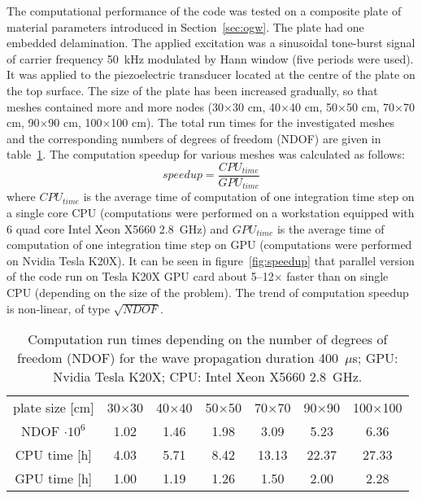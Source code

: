 \documentclass[12pt]{iopart}
\begin{document}
The computational performance of the code was tested on a composite plate of material parameters introduced in Section~\ref{sec:ogw}. The plate had one embedded delamination. The applied excitation was a sinusoidal tone-burst signal of carrier frequency 50~kHz modulated by Hann window (five periods were used). It was applied to the piezoelectric transducer located at the centre of the plate on the top surface. The size of the plate has been increased gradually, so that meshes contained more and more nodes (30\(\times\)30 cm, 40\(\times\)40 cm, 50\(\times\)50 cm, 70\(\times\)70 cm, 90\(\times\)90 cm, 100\(\times\)100 cm). The total run times for the investigated meshes and the corresponding numbers of degrees of freedom (NDOF) are given in table~\ref{tab:run_time}. The computation speedup for various meshes was calculated as follows:
\begin{equation}
speedup = \frac{CPU_{time}}{GPU_{time}}
\label{eq:speedup}
\end{equation}
where \(CPU_{time}\) is the average time of computation of one integration time step on a single core CPU (computations were performed on a workstation equipped with 6 quad core Intel
Xeon X5660 2.8~GHz) and \(GPU_{time}\) is the average time of computation of one integration time step on
GPU (computations were performed on Nvidia Tesla K20X). It can be seen in figure~\ref{fig:speedup} that parallel version of the code run on Tesla K20X GPU card about 5--12\(\times\) faster than on single CPU (depending on the size of the problem). The trend of computation speedup is non-linear, of type \(\sqrt{NDOF}\). 

\begin{table}
		\caption{Computation run times depending on the number of degrees of freedom (NDOF) for the wave propagation duration 400~\(\mu\)s; GPU: Nvidia Tesla K20X; CPU: Intel Xeon X5660 2.8~GHz.}
	\begin{indented}
	\item[]	\begin{tabular}{ccccccc} 
		\toprule	
		plate size [cm] & 30\(\times\)30  & 40\(\times\)40 & 50\(\times\)50 & 70\(\times\)70 & 90\(\times\)90 & 100\(\times\)100 \\
		NDOF \(\cdot 10^6\) & 1.02  & 1.46 & 1.98 & 3.09 & 5.23 & 6.36 \\
		\midrule
		CPU time [h]& 4.03& 5.71 & 8.42 & 13.13 & 22.37 & 27.33\\
		\midrule
		GPU time [h]& 1.00& 1.19 & 1.26 & 1.50 & 2.00 & 2.28\\
		\bottomrule 
	\end{tabular} 
\end{indented}
	\label{tab:run_time}
\end{table}
\end{document}
